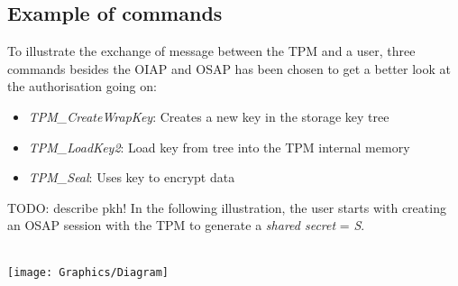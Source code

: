 \subsection{Example of commands}
To illustrate the exchange of message between the TPM and a user, three commands besides the OIAP and OSAP has been chosen to get a better look at the authorisation going on:
\begin{itemize}
	\item \textit{TPM\_CreateWrapKey}: Creates a new key in the storage key tree
	\item \textit{TPM\_LoadKey2}: Load key from tree into the TPM internal memory
	\item \textit{TPM\_Seal}: Uses key to encrypt data
\end{itemize}
TODO: describe pkh!
In the following illustration, the user starts with creating an OSAP session with the TPM to generate a \textit{shared secret} = \textit{S}. \\ \\
\begin{center}
\texttt{[image: Graphics/Diagram]}
\end{center}
% 


